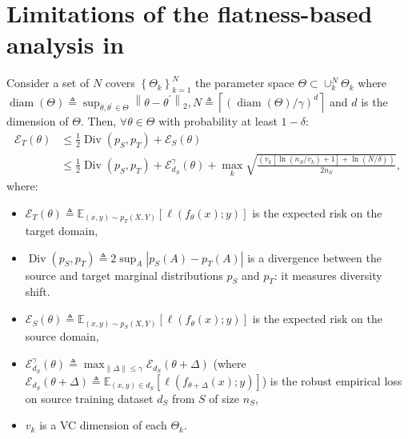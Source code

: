 \section{Limitations of the flatness-based analysis in \ood}%
\label{app:limit_proof_swad}%
\begin{theorem}
    Consider a set of $N$ covers $\left\{\Theta_{k}\right\}_{k=1}^{N}$ \sut the parameter space $\Theta \subset \cup_{k}^{N} \Theta_{k}$ where $\operatorname{diam}(\Theta)\triangleq\sup _{\theta, \theta^{\prime} \in \Theta}\left\|\theta-\theta^{\prime}\right\|_{2}, N\triangleq\left\lceil(\operatorname{diam}(\Theta) / \gamma)^{d} \right\rceil$ and $d$ is the dimension of $\Theta$. Then, $\forall\theta \in \Theta$ with probability at least $1-\delta$:
    \begin{equation} \label{eq:bound_swad}
        \begin{aligned}
            \mathcal{E}_{T}(\theta) & \leq \frac{1}{2} \operatorname{Div}(p_S, p_T) + \mathcal{E}_{S}(\theta)                                                                                                                    \\
                                   & \leq \frac{1}{2} \operatorname{Div}(p_S, p_T) + \mathcal{E}_{d_S}^{\gamma}(\theta)+\max _{k} \sqrt{\frac{\left(v_{k}\left[\ln \left(n_S / v_{k}\right)+1\right]+\ln (N / \delta)\right)}{2 n_S}},%
        \end{aligned}%
    \end{equation}%
    where:
    \begin{itemize}%
        \vspace{-0.5em}%
        \item $\mathcal{E}_{T}(\theta) \triangleq \mathbb{E}_{(x,y)\sim p_T(X,Y)}[\ell\left(f_\theta(x);y\right)]$ is the expected risk on the target domain,
        \item $\operatorname{Div}(p_S, p_T) \triangleq 2 \sup _{A}\left|p_{S}(A)-p_{T}(A)\right|$ is a divergence between the source and target marginal distributions $p_S$ and $p_T$: it measures diversity shift.%
        \item $\mathcal{E}_{S}(\theta) \triangleq \mathbb{E}_{(x,y)\sim p_S(X,Y)}[\ell\left(f_\theta(x);y\right)]$ is the expected risk on the source domain,
        \item $\mathcal{E}_{d_S}^{\gamma}(\theta) \triangleq \max _{\|\Delta\| \leq \gamma} \mathcal{E}_{d_S}(\theta+\Delta)$
        (where $\mathcal{E}_{d_S}(\theta+\Delta) \triangleq \mathbb{E}_{(x,y)\in d_S}[\ell\left(f_{\theta+\Delta}(x);y\right)]$)
        is the robust empirical loss on source training dataset $d_S$ from $S$ of size $n_S$,
        \item $v_{k}$ is a VC dimension of each $\Theta_{k}$.%
    \end{itemize}%
    \label{theorem:swad}%
    \vspace{-0.5em}%
\end{theorem}%
